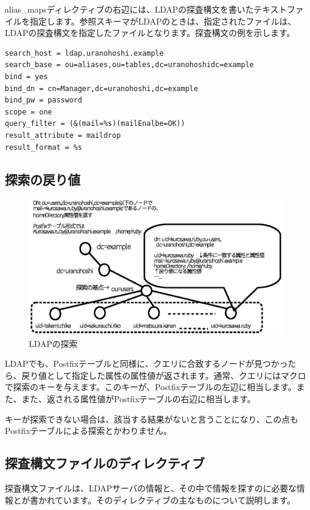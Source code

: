 alias\_mapsディレクティブの右辺には、LDAPの探査構文を書いたテキストファイルを指定します。参照スキーマがLDAPのときは、指定されたファイルは、LDAPの探査構文を指定したファイルとなります。探査構文の例を示します。

\begin{verbatim}
search_host = ldap.uranohoshi.example
search_base = ou=aliases,ou=tables,dc=uranohoshidc=example
bind = yes
bind_dn = cn=Manager,dc=uranohoshi,dc=example
bind_pw = password
scope = one
query_filter = (&(mail=%s)(mailEnalbe=OK))
result_attribute = maildrop
result_format = %s
\end{verbatim}

\subsection{探索の戻り値}

\begin{figure}[htbp]
	\includegraphics[width=12cm,clip]{draw/search.eps}
	\caption{LDAPの探索}
	\label{fig:｀search}
\end{figure}

LDAPでも、Postfixテーブルと同様に、クエリに合致するノードが見つかったら、戻り値として指定した属性の属性値が返されます。通常、クエリにはマクロで探索のキーを与えます。このキーが、Postfixテーブルの左辺に相当します。また、また、返される属性値がPostfixテーブルの右辺に相当します。

キーが探索できない場合は、該当する結果がないと言うことになり、この点もPostfixテーブルによる探索とかわりません。


\subsection{探査構文ファイルのディレクティブ}

探査構文ファイルは、LDAPサーバの情報と、その中で情報を探すのに必要な情報とが書かれています。そのディレクティブの主なものについて説明します。

